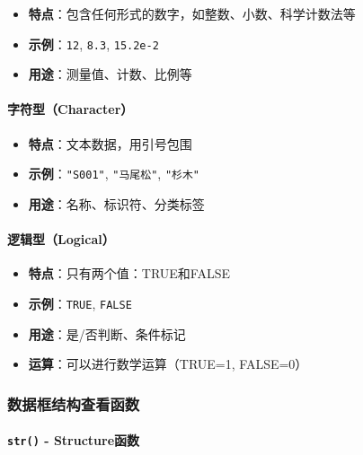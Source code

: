 \documentclass[
]{book}
\providecommand{\tightlist}{%
  \setlength{\itemsep}{0pt}\setlength{\parskip}{0pt}}
\begin{document}
\begin{itemize}
\tightlist
\item
  \textbf{特点}：包含任何形式的数字，如整数、小数、科学计数法等
\item
  \textbf{示例}：\texttt{12}, \texttt{8.3}, \texttt{15.2e-2}
\item
  \textbf{用途}：测量值、计数、比例等
\end{itemize}

\hypertarget{ux5b57ux7b26ux578bcharacter}{%
\paragraph{字符型（Character）}\label{ux5b57ux7b26ux578bcharacter}}

\begin{itemize}
\tightlist
\item
  \textbf{特点}：文本数据，用引号包围
\item
  \textbf{示例}：\texttt{"S001"}, \texttt{"马尾松"}, \texttt{"杉木"}
\item
  \textbf{用途}：名称、标识符、分类标签
\end{itemize}

\hypertarget{ux903bux8f91ux578blogical}{%
\paragraph{逻辑型（Logical）}\label{ux903bux8f91ux578blogical}}

\begin{itemize}
\tightlist
\item
  \textbf{特点}：只有两个值：TRUE和FALSE
\item
  \textbf{示例}：\texttt{TRUE}, \texttt{FALSE}
\item
  \textbf{用途}：是/否判断、条件标记
\item
  \textbf{运算}：可以进行数学运算（TRUE=1, FALSE=0）
\end{itemize}

\hypertarget{ux6570ux636eux6846ux7ed3ux6784ux67e5ux770bux51fdux6570}{%
\subsubsection{数据框结构查看函数}\label{ux6570ux636eux6846ux7ed3ux6784ux67e5ux770bux51fdux6570}}

\hypertarget{str---structureux51fdux6570}{%
\paragraph{\texorpdfstring{\texttt{str()} - Structure函数}{str() - Structure函数}}\label{str---structureux51fdux6570}}
\end{document}
